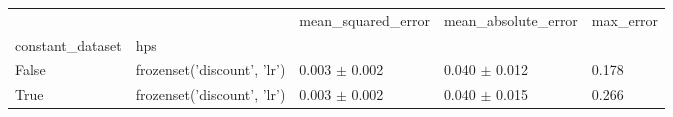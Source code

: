\begin{tabular}{lllll}
\toprule
 &  & mean_squared_error & mean_absolute_error & max_error \\
constant_dataset & hps &  &  &  \\
\midrule
False & frozenset({'discount', 'lr'}) & 0.003 $\pm$ 0.002 & 0.040 $\pm$ 0.012 & 0.178 \\
\cline{1-5}
True & frozenset({'discount', 'lr'}) & 0.003 $\pm$ 0.002 & 0.040 $\pm$ 0.015 & 0.266 \\
\cline{1-5}
\bottomrule
\end{tabular}

